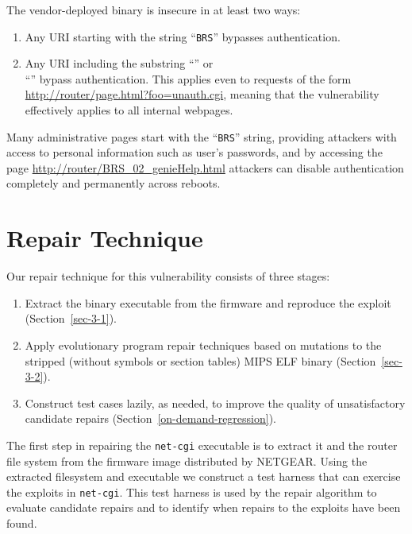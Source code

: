 \documentclass{sigcomm-alternate}
\begin{document}
The vendor-deployed binary is insecure in at least two ways: 
\begin{enumerate}
\item Any URI starting with the string ``{\tt BRS}'' bypasses authentication.

\item Any URI including the substring ``'' or\\
  ``'' bypass authentication. This applies
  even to requests of the form
  \url{http://router/page.html?foo=unauth.cgi}, meaning that the
  vulnerability effectively applies to all internal webpages.
\end{enumerate}

Many administrative pages start with the ``{\tt BRS}'' string, providing
attackers with access to personal information such as user's
passwords, and by accessing the page
\url{http://router/BRS_02_genieHelp.html} attackers can
disable authentication completely and permanently
across reboots.

\section{Repair Technique}
\label{sec-3}

Our repair technique for this vulnerability consists of three stages:
\begin{enumerate}
\item Extract the binary executable from the firmware and reproduce
the exploit (Section~\ref{sec-3-1}).
\item Apply evolutionary program repair techniques based on mutations
  to the stripped (without symbols or section tables) MIPS ELF binary
  (Section~\ref{sec-3-2}).
\item Construct test cases lazily, as needed, to improve the quality of
unsatisfactory candidate repairs (Section~\ref{on-demand-regression}). 
\end{enumerate} 

The first step in repairing the \texttt{net-cgi} executable is to extract
it and the router file system from the firmware image distributed by
NETGEAR.  Using the extracted filesystem and executable we construct a test
harness that can exercise the exploits in \texttt{net-cgi}.  This test harness
is used by the repair algorithm to evaluate candidate repairs and to
identify when repairs to the exploits have been found.
\end{document}
